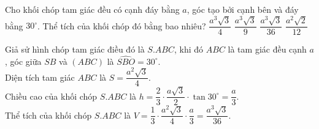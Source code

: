\begin{ex}%
 Cho khối chóp tam giác đều có cạnh đáy bằng $a$, góc tạo bởi cạnh bên và đáy bằng $30^\circ$. Thể tích của khối chóp đó bằng bao nhiêu?
 \choice
  {$\dfrac{a^3\sqrt{3}}{4}$}
  {$\dfrac{a^3\sqrt{3}}{9}$}
  {\True $\dfrac{a^3\sqrt{3}}{36}$}
  {$\dfrac{a^2\sqrt{2}}{12}$}
 \loigiai
  {
  \immini
  {
  Giả sử hình chóp tam giác điều đó là $S.ABC$, khi đó $ABC$ là tam giác đều cạnh $a$, góc giữa $SB$ và $(ABC)$ là $\widehat{SBO}=30^\circ$.\\
  Diện tích tam giác $ABC$ là $S = \dfrac{a^2 \sqrt{3}}{4}$.\\
  Chiều cao của khối chóp $S.ABC$ là $h = \dfrac{2}{3} \cdot \dfrac{a\sqrt{3}}{2} \cdot \tan 30^\circ = \dfrac{a}{3}$.\\
  Thể tích của khối chóp $S.ABC$ là $V = \dfrac{1}{3} \cdot \dfrac{a^2 \sqrt{3}}{4} \cdot \dfrac{a}{3} = \dfrac{a^3 \sqrt{3}}{36}$.
  }
  {
  }
  }
\end{ex}

